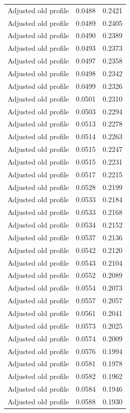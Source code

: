 \begin{table}[htbp]
\begin{tabular}{lll}
Adjusted old profile & 0.0488 & 0.2421 \\
Adjusted old profile & 0.0489 & 0.2405 \\
Adjusted old profile & 0.0490 & 0.2389 \\
Adjusted old profile & 0.0493 & 0.2373 \\
Adjusted old profile & 0.0497 & 0.2358 \\
Adjusted old profile & 0.0498 & 0.2342 \\
Adjusted old profile & 0.0499 & 0.2326 \\
Adjusted old profile & 0.0501 & 0.2310 \\
Adjusted old profile & 0.0503 & 0.2294 \\
Adjusted old profile & 0.0513 & 0.2278 \\
Adjusted old profile & 0.0514 & 0.2263 \\
Adjusted old profile & 0.0515 & 0.2247 \\
Adjusted old profile & 0.0515 & 0.2231 \\
Adjusted old profile & 0.0517 & 0.2215 \\
Adjusted old profile & 0.0528 & 0.2199 \\
Adjusted old profile & 0.0533 & 0.2184 \\
Adjusted old profile & 0.0533 & 0.2168 \\
Adjusted old profile & 0.0534 & 0.2152 \\
Adjusted old profile & 0.0537 & 0.2136 \\
Adjusted old profile & 0.0542 & 0.2120 \\
Adjusted old profile & 0.0543 & 0.2104 \\
Adjusted old profile & 0.0552 & 0.2089 \\
Adjusted old profile & 0.0554 & 0.2073 \\
Adjusted old profile & 0.0557 & 0.2057 \\
Adjusted old profile & 0.0561 & 0.2041 \\
Adjusted old profile & 0.0573 & 0.2025 \\
Adjusted old profile & 0.0574 & 0.2009 \\
Adjusted old profile & 0.0576 & 0.1994 \\
Adjusted old profile & 0.0581 & 0.1978 \\
Adjusted old profile & 0.0582 & 0.1962 \\
Adjusted old profile & 0.0584 & 0.1946 \\
Adjusted old profile & 0.0588 & 0.1930 \\

\end{tabular}
\end{table}
